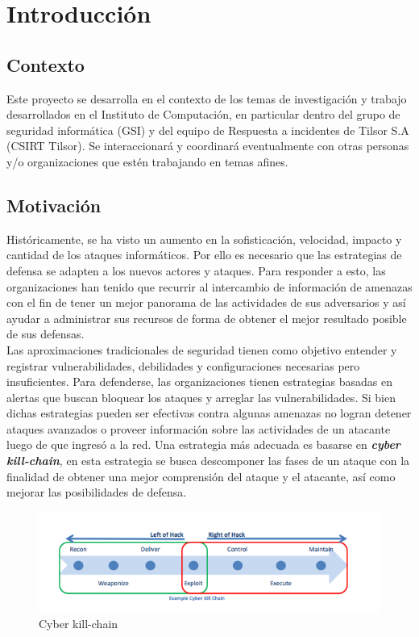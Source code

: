 \chapter{Introducción}
\label{capitulo1}
%

\section{Contexto}
\label{capitulo1:contexto}
Este proyecto se desarrolla en el contexto de los temas de investigación y trabajo desarrollados en el Instituto de Computación, en particular dentro del grupo de seguridad informática (GSI) y del equipo de Respuesta a incidentes de Tilsor S.A (CSIRT Tilsor). Se interaccionará y coordinará eventualmente con otras personas y/o organizaciones que estén trabajando en temas afines.

\section{Motivación}
\label{capitulo1:motivacion}
Históricamente, se ha visto un aumento en la sofisticación, velocidad, impacto y 
cantidad de los ataques informáticos. Por ello es necesario que las estrategias 
de defensa se adapten a los nuevos actores y ataques. Para responder a esto, las 
organizaciones han tenido que recurrir al intercambio de información de amenazas 
con el fin de tener un mejor panorama de las actividades de sus adversarios 
y así ayudar a administrar sus recursos de forma de obtener el mejor resultado 
posible de sus defensas. \\

Las aproximaciones tradicionales de seguridad tienen como objetivo entender y 
registrar vulnerabilidades, debilidades y configuraciones necesarias pero 
insuficientes. Para defenderse, las organizaciones tienen estrategias basadas en 
alertas que buscan bloquear los ataques y arreglar las vulnerabilidades. Si bien dichas estrategias pueden ser efectivas contra algunas 
amenazas no logran detener ataques avanzados o proveer información sobre las 
actividades de un atacante luego de que ingresó a la red. Una estrategia más 
adecuada es basarse en \textbf{\textit{cyber kill-chain}}, en esta estrategia se busca 
descomponer las fases de un ataque con la finalidad de obtener una mejor 
comprensión del ataque y el atacante, así como mejorar las posibilidades de 
defensa.

\begin{figure}[H]
  \label{fig:kill_chain}
  \centering
  \includegraphics[scale=0.55]{./images/killChain.png}
    \caption{Cyber kill-chain \protect\cite{b1}}
\end{figure}

